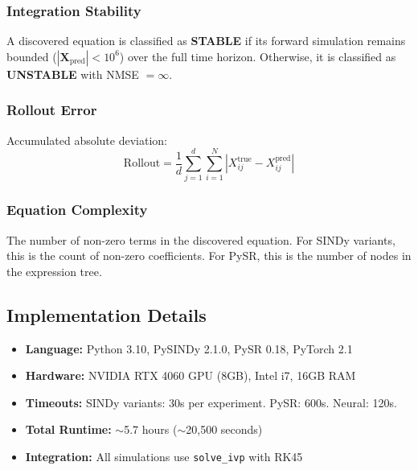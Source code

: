 \subsubsection{Integration Stability}
A discovered equation is classified as \textbf{STABLE} if its forward simulation remains bounded ($|\mathbf{X}_\text{pred}| < 10^6$) over the full time horizon. Otherwise, it is classified as \textbf{UNSTABLE} with NMSE $= \infty$.

\subsubsection{Rollout Error}
Accumulated absolute deviation:
\begin{equation}
\text{Rollout} = \frac{1}{d}\sum_{j=1}^{d}\sum_{i=1}^{N} |X_{ij}^\text{true} - X_{ij}^\text{pred}|
\end{equation}

\subsubsection{Equation Complexity}
The number of non-zero terms in the discovered equation. For SINDy variants, this is the count of non-zero coefficients. For PySR, this is the number of nodes in the expression tree.

\subsection{Implementation Details}
\begin{itemize}
    \item \textbf{Language:} Python 3.10, PySINDy 2.1.0, PySR 0.18, PyTorch 2.1
    \item \textbf{Hardware:} NVIDIA RTX 4060 GPU (8GB), Intel i7, 16GB RAM
    \item \textbf{Timeouts:} SINDy variants: 30s per experiment. PySR: 600s. Neural: 120s.
    \item \textbf{Total Runtime:} $\sim$5.7 hours ($\sim$20,500 seconds)
    \item \textbf{Integration:} All simulations use \texttt{solve\_ivp} with RK45
\end{itemize}
